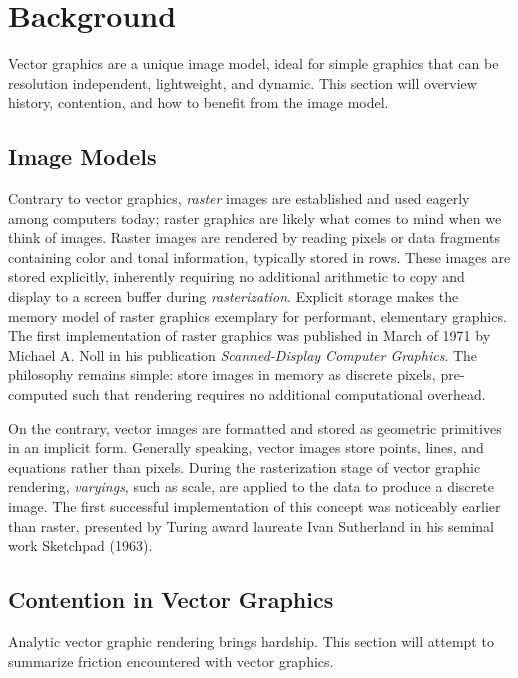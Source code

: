 \chapter{Background}\label{sec:background}

Vector graphics are a unique image model, ideal for simple graphics that can be resolution independent, lightweight, and dynamic. This section will overview history, contention, and how to benefit from the image model.

\section{Image Models}
Contrary to vector graphics, \emph{raster} images are established and used eagerly among computers today; raster graphics are likely what comes to mind when we think of images. Raster images are rendered by reading pixels or data fragments containing color and tonal information, typically stored in rows. These images are stored explicitly, inherently requiring no additional arithmetic to copy and display to a screen buffer during \emph{rasterization}. Explicit storage makes the memory model of raster graphics exemplary for performant, elementary graphics. The first implementation of raster graphics was published in March of 1971 by Michael A. Noll in his publication  \textit{Scanned-Display Computer Graphics}\cite{Noll71}. The philosophy remains simple: store images in memory as discrete pixels, pre-computed such that rendering requires no additional computational overhead.\medskip

On the contrary, vector images are formatted and stored as geometric primitives in an implicit form. Generally speaking, vector images store points, lines, and equations rather than pixels. During the rasterization stage of vector graphic rendering, \emph{varyings}, such as scale, are applied to the data to produce a discrete image. The first successful implementation of this concept was noticeably earlier than raster, presented by Turing award laureate Ivan Sutherland\cite{Sutherland88} in his seminal work Sketchpad\cite{Sutherland63} (1963).

\section{Contention in Vector Graphics}

Analytic vector graphic rendering brings hardship. This section will attempt to summarize friction encountered with vector graphics.


